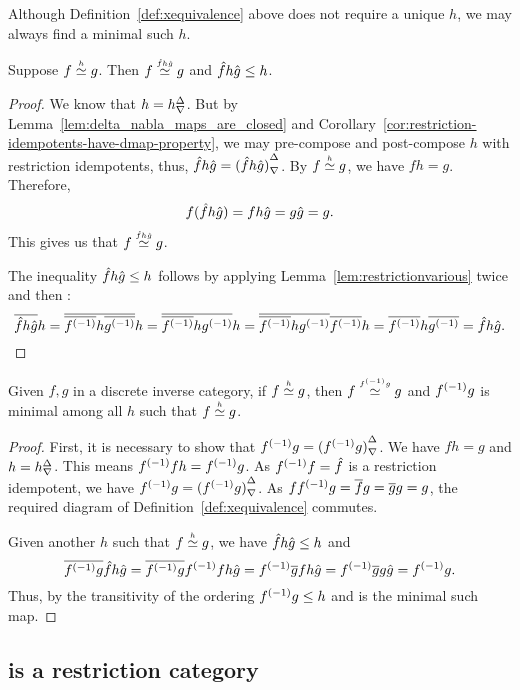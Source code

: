 Although Definition~\ref{def:xequivalence} above does not require a unique $h$, we may always find a
minimal such $h$.
\begin{lemma}\label{lem:equivalence-has-a-minimal-map}
Suppose $f\overset{\scriptscriptstyle h}{\simeq}g$. Then $f\overset{\scriptscriptstyle \hat{f}h\hat{g}}{\simeq} g$ and $\hat{f}h\hat{g} \le h$.
\end{lemma}
\begin{proof}
  We know that $h={h}^{\Delta}_{\nabla}$. But by Lemma~\ref{lem:delta_nabla_maps_are_closed} and
  Corollary~\ref{cor:restriction-idempotents-have-dmap-property}, we may pre-compose and
  post-compose $h$ with restriction idempotents, thus, $\hat{f}h\hat{g} = {(\hat{f}h\hat{g})}^{\Delta}_{\nabla}$. By
  $f\overset{\scriptscriptstyle h}{\simeq}g$, we have $fh = g$. Therefore,
  \[
    f(\hat{f}h\hat{g}) = f h \hat{g} = g \hat{g} = g.
  \]
  This gives us that  $f\overset{\scriptscriptstyle \hat{f}h\hat{g}}{\simeq} g$.

  The inequality $\hat{f}h\hat{g} \le h$ follows by applying Lemma~\ref{lem:restrictionvarious} twice
  and then :
  \[
     \overline{\hat{f}h\hat{g}} h = \overline{\overline{{f}^{(-1)}} h \overline{{g}^{(-1)}}} h
     = \overline{\overline{{f}^{(-1)}} h {g}^{(-1)}} h = \overline{\overline{{f}^{(-1)}} h {g}^{(-1)}} \overline{{f}^{(-1)}} h
     = \overline{{f}^{(-1)}} h \overline{{g}^{(-1)}} = \hat{f} h \hat{g}.
  \]
\end{proof}

\begin{corollary}\label{cor:inv-f-g-provides-equivalence}
  Given $f, g$ in a discrete inverse category, if $f\overset{\scriptscriptstyle h}{\simeq} g$,
  then $f \overset{\scriptscriptstyle {f}^{(-1)}g}{\simeq} g$ and ${f}^{(-1)} g$ is  minimal among all $h$ such
  that $f\overset{\scriptscriptstyle h}{\simeq} g$.
\end{corollary}
\begin{proof}
  First, it is necessary to show that ${f}^{(-1)}g = {({f}^{(-1)}g)}^{\Delta}_{\nabla}$. We have $f h = g$ and $h=
  {h}^{\Delta}_{\nabla}$. This means ${f}^{(-1)} f h = {f}^{(-1)} g$. As ${f}^{(-1)} f = \hat{f}$ is a restriction
  idempotent, we have ${f}^{(-1)}g = {({f}^{(-1)} g)}^{\Delta}_{\nabla}$.
  As $f {f}^{(-1)} g = \overline{f} g = \overline{g} g = g$, the required diagram of
  Definition~\ref{def:xequivalence} commutes.

  Given another $h$ such that $f\overset{\scriptscriptstyle h}{\simeq}g$, we have $\hat{f}h\hat{g} \le h$ and
  \[
    \overline{{f}^{(-1)}g}\hat{f}h\hat{g} =  \overline{{f}^{(-1)}g}{f}^{(-1)} f h\hat{g} =
    {f}^{(-1)}\overline{g} f h\hat{g} = {f}^{(-1)} \overline{g} g \hat{g} = {f}^{(-1)}g.
  \]
  Thus, by the transitivity of the ordering ${f}^{(-1)}g \le h$ and is the minimal such map.
\end{proof}

\subsection{\hypXt is a restriction category} %
\label{subsec:the_restriction_category_hypxt}


